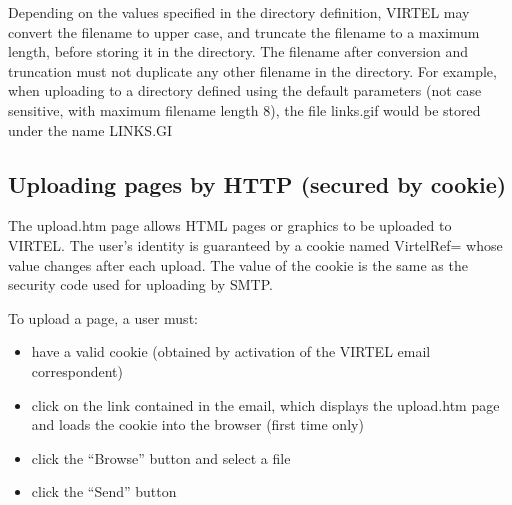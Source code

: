 \documentclass[letterpaper,10pt,english]{sphinxmanual}
\begin{document}
\sphinxAtStartPar
Depending on the values specified in the directory definition, VIRTEL may convert the filename to upper case, and
truncate the filename to a maximum length, before storing it in the directory. The filename after conversion and
truncation must not duplicate any other filename in the directory. For example, when uploading to a directory defined
using the default parameters (not case sensitive, with maximum filename length 8), the file links.gif would be stored
under the name LINKS.GI

\label{\detokenize{audit_operations_ and_performance:v462ap-http-uploading-pages}}
\ignorespaces 

\subsection{Uploading pages by HTTP (secured by cookie)}
\label{\detokenize{audit_operations_ and_performance:uploading-pages-by-http-secured-by-cookie}}\label{\detokenize{audit_operations_ and_performance:index-72}}
\sphinxAtStartPar
The upload.htm page allows HTML pages or graphics to be uploaded to VIRTEL. The user’s identity is guaranteed by a
cookie named VirtelRef= whose value changes after each upload. The value of the cookie is the same as the security
code used for uploading by SMTP.

\sphinxAtStartPar
To upload a page, a user must:
\begin{itemize}
\item {} 
\sphinxAtStartPar
have a valid cookie (obtained by activation of the VIRTEL e\sphinxhyphen{}mail correspondent)

\item {} 
\sphinxAtStartPar
click on the link contained in the e\sphinxhyphen{}mail, which displays the upload.htm page and loads the cookie into the browser (first time only)

\item {} 
\sphinxAtStartPar
click the “Browse” button and select a file

\item {} 
\sphinxAtStartPar
click the “Send” button

\end{itemize}
\end{document}
